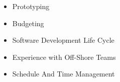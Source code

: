 
  \begin{itemize}
    \setlength\itemsep{-0.3em}
    \item Prototyping
    \item Budgeting
    \item Software Development Life Cycle %
    \item Experience with Off-Shore Teams %
    \item Schedule And Time Management
  \end{itemize}
